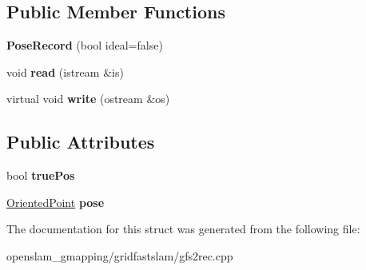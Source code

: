 \subsection*{Public Member Functions}
\begin{DoxyCompactItemize}
\item 
\mbox{\label{structPoseRecord_af7fce1f55b2fdefd5124681e1a3c20a0}} 
{\bfseries Pose\+Record} (bool ideal=false)
\item 
\mbox{\label{structPoseRecord_a3dd03a327aeede17e7da2ecb62fed521}} 
void {\bfseries read} (istream \&is)
\item 
\mbox{\label{structPoseRecord_a10628a8d9e3d5854a134a895c90e4d66}} 
virtual void {\bfseries write} (ostream \&os)
\end{DoxyCompactItemize}
\subsection*{Public Attributes}
\begin{DoxyCompactItemize}
\item 
\mbox{\label{structPoseRecord_a1d1cbe98e5e14a3a05ba9dcab5b221d7}} 
bool {\bfseries true\+Pos}
\item 
\mbox{\label{structPoseRecord_ad8e188f7b9e4e70623af2bb3faffd63e}} 
\hyperlink{structGMapping_1_1orientedpoint}{Oriented\+Point} {\bfseries pose}
\end{DoxyCompactItemize}


The documentation for this struct was generated from the following file\+:\begin{DoxyCompactItemize}
\item 
openslam\+\_\+gmapping/gridfastslam/gfs2rec.\+cpp\end{DoxyCompactItemize}
